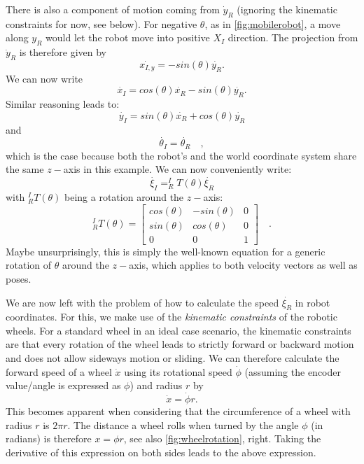 There is also a component of motion coming from $ \dot{y}_R$ (ignoring the kinematic constraints for now, see below).  For negative $ \theta$, as in \cref{fig:mobilerobot}, a move along $y_R$ would let the robot move into positive $ X_I$ direction. The projection from $ \dot{y}_R$ is therefore given by
\begin{equation}
\dot{x_{I,y}}=-sin(\theta)\dot{y_R}.
\end{equation}
We can now write
\begin{equation}
\dot{x_I}=cos(\theta) \dot{x_R} - sin(\theta) \dot{y_R}.
\end{equation}
Similar reasoning leads to:
\begin{equation}
\dot{y_I}=sin(\theta) \dot{x_R} + cos(\theta) \dot{y_R}
\end{equation}
and
\begin{equation}
\dot{\theta_I}=\dot{\theta_R}\quad,
\end{equation}
which is the case because both the robot's and the world coordinate system share the same $z-$axis in this example.
We can now conveniently write:
\begin{equation}
\dot{\xi_I}=^I_RT(\theta)\dot{\xi_R}
\end{equation}
with $^I_RT(\theta)$ being a rotation around the $z-$axis:
\begin{equation}
^I_RT(\theta)=\left[\begin{array}{ccc}
cos(\theta) & -sin(\theta) & 0 \\
sin(\theta) & cos(\theta) & 0 \\
0 & 0 & 1\end{array}\right]\quad .
\end{equation}
Maybe unsurprisingly, this is simply the well-known equation for a generic rotation of $\theta$ around the $z-$axis, which applies to both velocity vectors as well as poses.

We are now left with the problem of how to calculate the speed $ \dot{\xi_R}$ in robot coordinates. For this, we make use of the \textsl{kinematic constraints} of the robotic wheels.
For a standard wheel in an ideal case scenario, the kinematic constraints are that every rotation of the wheel leads to strictly forward or backward motion and does not allow sideways motion or sliding. We can therefore calculate the forward speed of a wheel $ \dot{x}$ using its rotational speed $ \dot{\phi}$ (assuming the encoder value/angle is expressed as $ \phi$) and radius $ r$ by
\begin{equation}
\dot{x}=\dot{\phi}r.
\end{equation}
This becomes apparent when considering that the circumference of a wheel with radius $r$ is $2\pi r$. The distance a wheel rolls when turned by the angle $ \phi$ (in radians) is therefore $ x=\phi r$, see also \cref{fig:wheelrotation}, right. Taking the derivative of this expression on both sides leads to the above expression.


